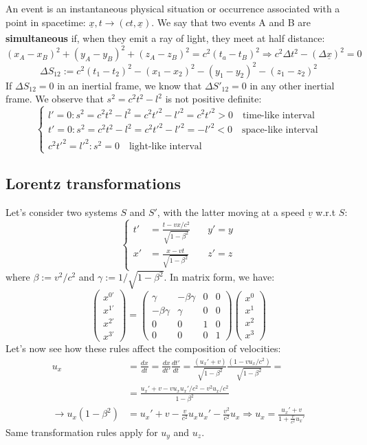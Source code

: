 \documentclass[../main.tex]{subfiles}
\begin{document}
An event is an instantaneous physical situation or occurrence associated with a point in spacetime: $\underline{x},t\xrightarrow[]{}(ct,\underline{x})$. We say that two events A and B are \textbf{simultaneous} if, when they emit a ray of light, they meet at half distance:
\[
(x_A-x_B)^2+(y_A-y_B)^2+(z_A-z_B)^2=c^2(t_a-t_B)^2\Rightarrow c^2\Delta t^2-(\Delta\underline{x})^2=0
\]
\[
\Delta S_{12}:=c^2(t_1-t_2)^2-(x_1-x_2)^2-(y_1-y_2)^2-(z_1-z_2)^2
\]
If $\Delta S_{12}=0$ in an inertial frame, we know that $\Delta S'_{12}=0$ in any other inertial frame. We observe that $s^2=c^2t^2-l^2$ is not positive definite:
\[
\begin{cases}
l'=0: s^2=c^2t^2-l^2=c^2t'^2-l'^2=c^2t'^2>0 \quad \text{time-like interval}\\
t'=0: s^2=c^2t^2-l^2=c^2t'^2-l'^2=-l'^2<0 \quad \text{space-like interval}\\
c^2t'^2=l'^2: s^2=0 \quad \text{light-like interval}
\end{cases}
\]
\subsection{Lorentz transformations}
Let's consider two systems $S$ and $S'$, with the latter moving at a speed $\underline{v}$ w.r.t $S$:
\[
\left\{
\begin{aligned}
t'&=\frac{t-vx/c^2}{\sqrt{1-\beta^2}} \quad &y'=y\\
x'&=\frac{x-vt}{\sqrt{1-\beta^2}} \quad &z'=z
\end{aligned}
\right.
\]
where $\beta:=v^2/c^2$ and $\gamma:=1/\sqrt{1-\beta^2}$. In matrix form, we have:
\[
\begin{pmatrix}
x^{0'}\\
x^{1'}\\
x^{2'}\\
x^{3'}
\end{pmatrix}=
\begin{pmatrix}
\gamma & -\beta\gamma & 0 & 0\\
-\beta\gamma & \gamma & 0 & 0\\
0 & 0 & 1 & 0\\
0 & 0 & 0 & 1
\end{pmatrix}
\begin{pmatrix}
x^0\\
x^1\\
x^2\\
x^3
\end{pmatrix}
\]
Let's now see how these rules affect the composition of velocities:
\begin{align*}
    u_x&=\frac{dx}{dt}=\frac{dx}{dt'}\frac{dt'}{dt}=\frac{(u_x'+v)}{\sqrt{1-\beta^2}}\frac{(1-vu_x/c^2)}{\sqrt{1-\beta^2}}=\\
    &=\frac{u_x'+v-vu_xu_x'/c^2-v^2u_x/c^2}{1-\beta^2}\\
    \xrightarrow[]{}u_x(1-\beta^2)&=u_x'+v-\frac{v}{c^2}u_xu_x'-\frac{v^2}{c^2}u_x\Rightarrow u_x=\frac{u_x'+v}{1+\frac{v}{c^2}u_x'}
\end{align*}
Same transformation rules apply for $u_y$ and $u_z$.
\end{document}
